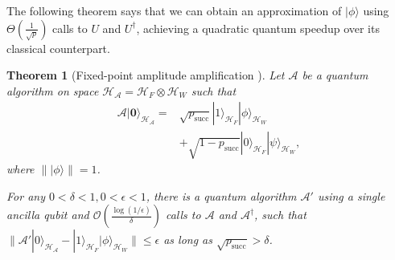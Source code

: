 \documentclass[journal]{IEEEtran}
\newtheorem{theorem}{Theorem}
\newcommand{\syzn}[1]{{\color{violet}{#1}}}
\begin{document}
The following theorem says that we can obtain an approximation of $|\phi\rangle$ using $\Theta(\frac{1}{\sqrt{p}})$ calls to $U$ and $U^{\dagger}$, achieving a quadratic quantum speedup over its classical counterpart. %

\begin{theorem}[Fixed-point amplitude amplification {\cite[Theorem 27]{gilyen2019singular}}]
    \label{thm:amplitude_amplification}
  Let $\mathcal{A}$ be a quantum algorithm on space $\mathcal{H}_{\mathcal{A}} = \mathcal{H}_F\otimes \mathcal{H}_W$ such that
    \begin{align}
    \mathcal{A}|\mathbf{0}\rangle_{\mathcal{H}_{\mathcal{A}}}=&\sqrt{p_{\mathrm{succ}}}|1\rangle_{\mathcal{H}_F}|\phi\rangle_{\mathcal{H}_W}\nonumber\\&+\sqrt{1-p_{\mathrm{succ}}}|0\rangle_{\mathcal{H}_F}|\psi\rangle_{\mathcal{H}_W},
    \end{align}
    where $\||\phi\rangle\| = 1$.

    
    For any $0 < \delta < 1,0 < \epsilon < 1$, there is a quantum algorithm $\mathcal{A}'$ using a single ancilla qubit and
    $\mathcal{O}(\frac{\log(1/\epsilon)}{\delta})$ calls to $\mathcal{A}$ and $\mathcal{A}^{\dagger}$, such that $\|\mathcal{A}'|0\rangle_{\mathcal{H}_{\mathcal{A}}}-|1\rangle_{\mathcal{H}_F}|\phi\rangle_{\mathcal{H}_W}\|\le \epsilon$ as long as $\sqrt{p_{\mathrm{succ}}} > \delta$. %
\end{theorem}
\end{document}
